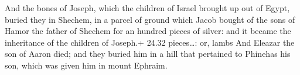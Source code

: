  And the bones of Joseph, which the children of Israel
brought up out of Egypt, buried they in Shechem, in a parcel of ground
which Jacob bought of the sons of Hamor the father of Shechem for an
hundred pieces of silver: and it became the inheritance of the children
of Joseph.+ 24.32 pieces\ldots: or, lambs  And Eleazar
the son of Aaron died; and they buried him in a hill that pertained to
Phinehas his son, which was given him in mount Ephraim.
